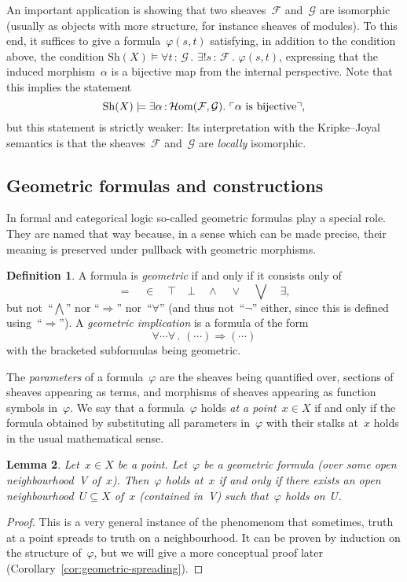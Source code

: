 \documentclass[10pt]{amsart}
\theoremstyle{definition}
\newtheorem{defn}{Definition}[section]
\theoremstyle{plain}
\newtheorem{lemma}[defn]{Lemma}
\theoremstyle{remark}
\newcommand{\F}{\mathcal{F}}
\renewcommand{\G}{\mathcal{G}}
\newcommand{\HOM}{\mathcal{H}\mathrm{om}}
\newcommand{\Sh}{\mathrm{Sh}}
\newcommand{\?}{\,{:}\,}
\renewcommand{\_}{\mathpunct{.}\,}
\newcommand{\speak}[1]{\ulcorner\text{\textnormal{#1}}\urcorner}
\begin{document}
An important application is showing that two sheaves~$\F$ and~$\G$ are
isomorphic (usually as objects with more structure, for instance sheaves of
modules). To this end, it suffices to give a formula~$\varphi(s,t)$ satisfying,
in addition to the condition above, the condition
$\Sh(X) \models \forall t\?\G\_ \exists! s\?\F\_ \varphi(s,t)$,
expressing that the induced morphism~$\alpha$ is a bijective map from the
internal perspective. Note that this implies the statement
\[ \Sh(X) \models \exists \alpha\?\HOM(\F,\G)\_ \speak{$\alpha$ is bijective},
\]
but this statement is strictly weaker: Its interpretation with the
Kripke--Joyal semantics is that the sheaves~$\F$ and~$\G$ are \emph{locally}
isomorphic.


\subsection{Geometric formulas and
constructions}\label{sect:geometric-formulas-and-constructions}
In formal and categorical logic so-called geometric formulas play a
special role. They are named that way because, in a sense which can be made
precise, their meaning is preserved under pullback with geometric morphisms.
\begin{defn}A formula is \emph{geometric} if and only if it consists only of
\[ {=} \quad {\in} \quad {\top} \quad {\bot} \quad {\wedge} \quad {\vee} \quad
{\bigvee} \quad {\exists}, \]
but not~``$\bigwedge$'' nor ``$\Rightarrow$'' nor~``$\forall$'' (and thus
not~``$\neg$'' either, since this is defined using~``$\Rightarrow$'').
A \emph{geometric implication} is a formula of the form
\[ \forall \cdots \forall\_ (\cdots) \Rightarrow (\cdots) \]
with the bracketed subformulas being geometric.
\end{defn}
The \emph{parameters} of a formula~$\varphi$ are the sheaves
being quantified over, sections of sheaves appearing as terms, and morphisms of
sheaves appearing as function symbols in~$\varphi$.
We say that a formula~$\varphi$ holds \emph{at a point~$x \in X$} if and only
if the formula obtained by substituting all parameters in~$\varphi$ with their
stalks at~$x$ holds in the usual mathematical sense.

\begin{lemma}\label{lemma:geometric-stalk-neighbourhood}
Let~$x \in X$ be a point. Let~$\varphi$ be a geometric formula (over some open
neighbourhood~V of~$x$).
Then~$\varphi$ holds at~$x$ if and only if there exists an open neighbourhood~$U
\subseteq X$ of~$x$ (contained in~V) such that~$\varphi$ holds on~$U$.
\end{lemma}
\begin{proof}This is a very general instance of the phenomenom that sometimes,
truth at a point spreads to truth on a neighbourhood. It can be proven by
induction on the structure of~$\varphi$, but we will give a more conceptual
proof later (Corollary~\ref{cor:geometric-spreading}).
\end{proof}
\end{document}
